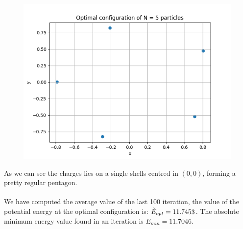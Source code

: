 \documentclass{article}
\begin{document}
\begin{figure}[H]
    \centering
    \includegraphics[width=\linewidth]{images/Figure2.N5.png}
    \caption{}
    \label{fig:Figure2.N5.png}
\end{figure}
\noindent 
As we can see the charges lies on a single shells centred in $(0,0)$, forming a pretty regular pentagon. \\\\
We have computed the average value of the last 100 iteration, the value of the potential energy at the optimal configuration is: $\Tilde{E}_{opt}=11.7453$. The absolute minimum energy value found in an iteration is $E_{min}=11.7046$.\\\\

\clearpage
\end{document}
